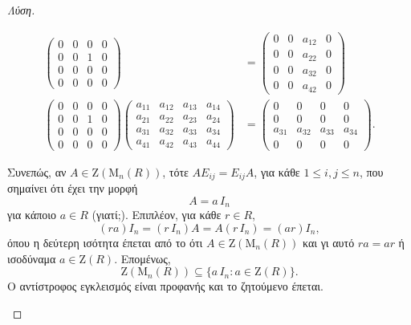 \documentclass[12pt,a4paper,reqno]{amsart}
\theoremstyle{definition}
\newcommand{\rmM}{\mathrm{M}}
\newcommand{\rmZ}{\mathrm{Z}}
\begin{document}
\begin{proof}[Λύση]
\begin{itemize}
\begin{align*}
      \begin{pmatrix}
        0 & 0 & 0 & 0 \\
        0 & 0 & 1 & 0 \\
        0 & 0 & 0 & 0 \\
        0 & 0 & 0 & 0 
      \end{pmatrix}
      &=
      \begin{pmatrix}
        0 & 0 & a_{12} & 0 \\
        0 & 0 & a_{22} & 0 \\
        0 & 0 & a_{32} & 0 \\
        0 & 0 & a_{42} & 0 
      \end{pmatrix} \\
      \begin{pmatrix}
        0 & 0 & 0 & 0 \\
        0 & 0 & 1 & 0 \\
        0 & 0 & 0 & 0 \\
        0 & 0 & 0 & 0 
      \end{pmatrix}
      \begin{pmatrix}
        a_{11} & a_{12} & a_{13} & a_{14} \\
        a_{21} & a_{22} & a_{23} & a_{24} \\
        a_{31} & a_{32} & a_{33} & a_{34} \\
        a_{41} & a_{42} & a_{43} & a_{44} 
      \end{pmatrix}
      &=
      \begin{pmatrix}
        0 & 0 & 0 & 0 \\
        0 & 0 & 0 & 0 \\
        a_{31} & a_{32} & a_{33} & a_{34} \\
        0 & 0 & 0 & 0
      \end{pmatrix}.
    \end{align*} 
    
    Συνεπώς, αν $A \in \rmZ(\rmM_n(R))$, τότε $AE_{ij} = E_{ij}A$, για κάθε $1 \le i,j \le n$, που σημαίνει ότι έχει την μορφή 
    \[
    A = a \, I_n
    \]
    για κάποιο $a \in R$ (γιατί;).  Επιπλέον, για κάθε $r \in R$, 
    \[
    (ra)I_n = (r\,I_n)A = A(r\,I_n) = (ar)I_n,
    \]
    όπου η δεύτερη ισότητα έπεται από το ότι $A \in \rmZ(\rmM_n(R))$ και γι αυτό $ra = ar$ ή ισοδύναμα $a \in \rmZ(R)$. Επομένως,
    \[
    \rmZ(\rmM_n(R)) \subseteq \{a \, I_n : a \in \rmZ(R)\}.
    \]
    Ο αντίστροφος εγκλεισμός είναι προφανής και το ζητούμενο έπεται.
  \end{itemize}
\end{proof}
\end{document}
